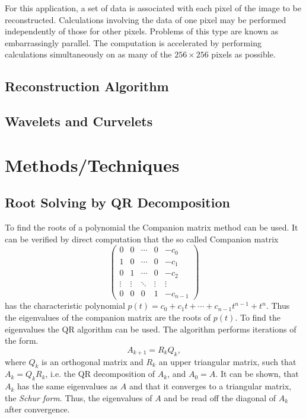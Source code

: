 \documentclass{article}
\begin{document}
For this application, a set of data is associated with each pixel of the image to be reconstructed. Calculations involving the data of one pixel may be performed independently of those for other pixels. Problems of this type are known as embarrassingly parallel. The computation is accelerated by performing calculations simultaneously on as many of the $256\times256$ pixels as possible. 

\subsection*{Reconstruction Algorithm}

\subsection*{Wavelets and Curvelets}

\section*{Methods/Techniques}

\subsection*{Root Solving by QR Decomposition}

To find the roots of a polynomial the Companion matrix method can be used. It can be verified by direct computation that the so called Companion matrix
$$\left(\begin{array}{ccccc}0 & 0 & \cdots & 0 & -c_0 \\1 & 0 & \cdots & 0 & -c_1 \\0 & 1 & \cdots & 0 & -c_2 \\\vdots & \vdots & \ddots & \vdots & \vdots \\0 & 0 & 0 & 1 & -c_{n-1}\end{array}\right)$$
has the characteristic polynomial $p(t)=c_0+c_1 t + \cdots + c_{n-1} t^{n-1} + t^n$. Thus the eigenvalues of the companion matrix are the roots of $p(t)$. To find the eigenvalues the QR algorithm can be used. The algorithm performs iterations of the form. 
$$A_{k+1} = R_{k} Q_{k},$$ 
where $Q_k$ is an orthogonal matrix and $R_k$ an upper triangular matrix, such that $A_k = Q_k R_k$, i.e. the QR decomposition of $A_k$, and $A_0=A$. It can be shown, that $A_k$ has the same eigenvalues as $A$ and that it converges to a triangular matrix, the {\it Schur form}.  Thus, the eigenvalues of $A$ and be read off the diagonal of $A_k$ after convergence.
\end{document}
